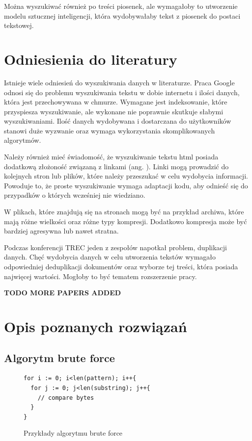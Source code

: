 Można wyszukiwać również po treści piosenek, ale wymagałoby to utworzenie modelu
sztucznej inteligencji, która wydobywałaby tekst z piosenek do postaci tekstowej.

\section{Odniesienia do literatury}

Istnieje wiele odniesień do wyszukiwania danych w literaturze. Praca Google 
\cite{bib:internet:htmlSearchGoogle} odnosi się do problemu wyszukiwania tekstu 
w dobie internetu i ilości danych, która jest przechowywana w chmurze. Wymagane
jest indeksowanie, które przyspiesza wyszukiwanie, ale wykonane nie poprawnie 
skutkuje słabymi wyszukiwaniami. Ilość danych wydobywana i dostarczana do
użytkowników stanowi duże wyzwanie oraz wymaga wykorzystania skomplikowanych 
algorytmów. 

Należy również mieć świadomość, że wyszukiwanie tekstu html posiada dodatkową 
złożoność związaną z linkami (ang. ). Linki mogą prowadzić do 
kolejnych stron lub plików, które należy przeszukać w celu wydobycia informacji.
Powoduje to, że proste wyszukiwanie wymaga adaptacji kodu, aby odnieść się do 
przypadków o których wcześniej nie wiedziano.

W plikach, które znajdują się na stronach mogą być na przykład archiwa, które
mają różne wielkości oraz różne typy kompresji. Dodatkowo kompresja może być 
bardziej agresywna lub nawet stratna.

Podczas konferencji TREC \cite{bib:konferencja:TRECDuplicates} jeden z zespołów 
napotkał problem, duplikacji danych. Chęć wydobycia danych w celu utworzenia
tekstów wymagało odpowiedniej deduplikacji dokumentów oraz wyborze tej treści,
która posiada najwięcej wartości. Mogłoby to być tematem rozszerzenie pracy. 

\textbf{TODO MORE PAPERS ADDED}

\section{Opis poznanych rozwiązań}
\subsection{Algorytm brute force}

\begin{figure}[h]
  \centering
  \begin{lstlisting}
for i := 0; i<len(pattern); i++{
  for j := 0; j<len(substring); j++{
    // compare bytes
  }
}
  \end{lstlisting}
  \caption{Przykłady algorytmu brute force}
  \label{fig:code:bruteForceComparison}
\end{figure}

